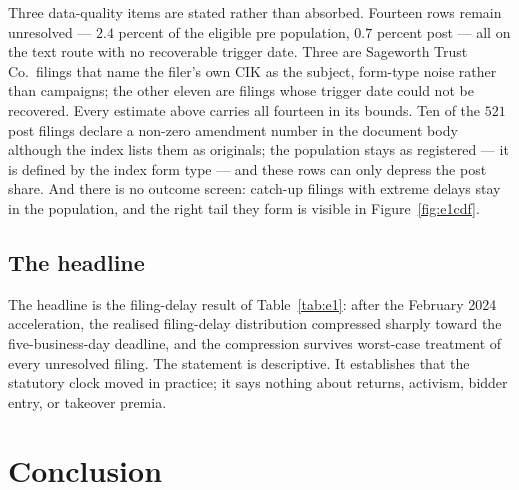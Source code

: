 \documentclass[11pt]{article}
\begin{document}
Three data-quality items are stated rather than absorbed. Fourteen rows remain unresolved ---
$2.4$ percent of the eligible pre population, $0.7$ percent post --- all on the text route with
no recoverable trigger date. Three are Sageworth Trust Co.\ filings that name the filer's own
CIK as the subject, form-type noise rather than campaigns; the other eleven are filings whose
trigger date could not be recovered. Every estimate above carries all fourteen in its bounds.
Ten of the $521$ post filings declare a non-zero amendment number in the document body although
the index lists them as originals; the population stays as registered --- it is defined by the
index form type --- and these rows can only depress the post share. And there is no outcome
screen: catch-up filings with extreme delays stay in the population, and the right tail they
form is visible in Figure~\ref{fig:e1cdf}.

\subsection{The headline}
\label{sec:e1headline}

The headline is the filing-delay result of Table~\ref{tab:e1}: after the
February 2024 acceleration, the realised filing-delay distribution compressed sharply toward the
five-business-day deadline, and the compression survives worst-case treatment of every
unresolved filing. The statement is descriptive. It establishes that the statutory clock moved
in practice; it says nothing about returns, activism, bidder entry, or takeover premia.

\section{Conclusion}
\label{sec:conclusion}
\end{document}
